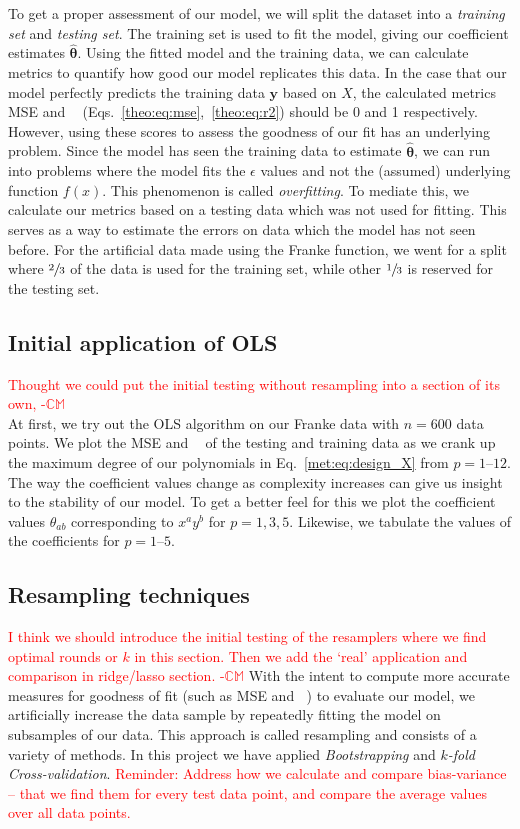 \documentclass[twocolumn,english,notitlepage]{article}
\newcommand{\comment}[1]{\textcolor{red}{#1}}
\renewcommand{\vec}[1]{\boldsymbol{#1}}
\DeclareMathOperator{\Rsquared}{R^2}
\newcommand{\Carl}{$\mathbb{CM}$}
\begin{document}
            To get a proper assessment of our model, we will split the dataset into a \textit{training set} and \textit{testing set}. The training set is used to fit the model, giving our coefficient estimates $\vec{\hat{\theta}}$. Using the fitted model and the training data, we can calculate metrics to quantify how good our model replicates this data. In the case that our model perfectly predicts the training data $\vec{y}$ based on $X$, the calculated metrics MSE and $\Rsquared$ (Eqs.~\ref{theo:eq:mse},~\ref{theo:eq:r2}) should be 0 and 1 respectively. However, using these scores to assess the goodness of our fit has an underlying problem. Since the model has seen the training data to estimate $\vec{\hat{\theta}}$, we can run into problems where the model fits the $\epsilon$ values and not the (assumed) underlying function $f(x)$. This phenomenon is called \textit{overfitting}. To mediate this, we calculate our metrics based on a testing data which was not used for fitting. This serves as a way to estimate the errors on data which the model has not seen before. For the artificial data made using the Franke function, we went for a split where $\sfrac{2}{3}$ of the data is used for the training set, while other $\sfrac{1}{3}$ is reserved for the testing set.


    \subsection{Initial application of OLS}
        \comment{Thought we could put the initial testing without resampling into a section of its own, -\Carl}\\
        At first, we try out the OLS algorithm on our Franke data with $n=600$ data points. We plot the MSE and $\Rsquared$ of the testing and training data as we crank up the maximum degree of our polynomials in Eq.~\eqref{met:eq:design_X} from $p=1 \text{--} 12$. The way the coefficient values change as complexity increases can give us insight to the stability of our model. To get a better feel for this we plot the coefficient values $\theta_{ab}$ corresponding to $x^ay^b$ for $p=1,3,5$. Likewise, we tabulate the values of the coefficients for $p=1 \text{--} 5$. 

    \subsection{Resampling techniques}
        \comment{I think we should introduce the initial testing of the resamplers where we find optimal rounds or $k$ in this section. Then we add the `real' application and comparison in ridge/lasso section. -\Carl}
        With the intent to compute more accurate measures for goodness of fit (such as MSE and $\Rsquared$) to evaluate our model, we 
        artificially increase the data sample by repeatedly fitting the model on subsamples of our data. This approach is called resampling and consists of a variety of methods. In this project we have applied \textit{Bootstrapping} and \textit{$k$-fold Cross-validation}. 
        \comment{Reminder: Address how we calculate and compare bias-variance -- that we find them for every test data point, and compare the average values over all data points.}
\end{document}
